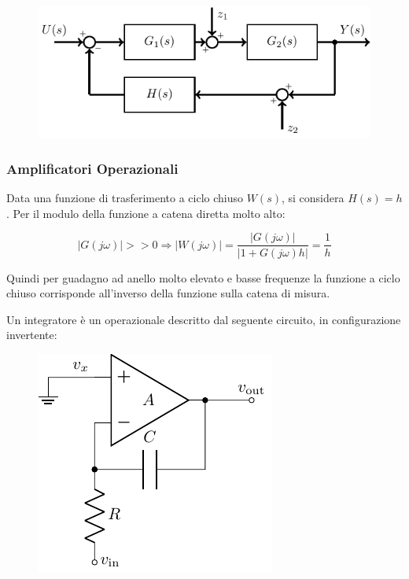 \documentclass{article}
\numberwithin{equation}{subsection}
\begin{document}
\begin{figure}[H]%
    \centering
    \includegraphics{controreazione-5.pdf}%
\end{figure}

\subsubsection{Amplificatori Operazionali}

Data una funzione di trasferimento a ciclo chiuso $W(s)$, si considera $H(s)=h$. Per il modulo della funzione a catena diretta molto alto: 

\begin{equation*}
    |G(j\omega)|>>0\Rightarrow|W(j\omega)|=\displaystyle\frac{|G(j\omega)|}{|1+G(j\omega)h|}=\frac{1}{h}
\end{equation*}

Quindi per guadagno ad anello molto elevato e basse frequenze la funzione a ciclo chiuso corrisponde all'inverso della funzione sulla catena di misura. 


Un integratore è un operazionale descritto dal seguente circuito, in configurazione invertente:

\begin{figure}[H]%
    \centering
    \includegraphics{circuito-integratore.pdf}%
\end{figure}
\end{document}
